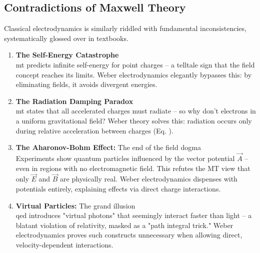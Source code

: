 \subsection{Contradictions of Maxwell Theory}
Classical electrodynamics is similarly riddled with fundamental inconsistencies, systematically glossed over in textbooks.
\begin{enumerate}
    \item \textbf{The Self-Energy Catastrophe}\\\gls{mt} predicts infinite self-energy for point charges – a telltale sign that the field concept reaches its limits. Weber electrodynamics elegantly bypasses this: by eliminating fields, it avoids divergent energies.
    \item \textbf{The Radiation Damping Paradox}\\\gls{mt} states that all accelerated charges must radiate – so why don’t electrons in a uniform gravitational field? Weber theory solves this: radiation occurs only during relative acceleration between charges (Eq. ).
    \item \textbf{The Aharonov-Bohm Effect:} The end of the field dogma\\Experiments show quantum particles influenced by the vector potential $\vec{A}$ – even in regions with no electromagnetic field. This refutes the MT view that only $\vec{E}$ and $\vec{B}$ are physically real. Weber electrodynamics dispenses with potentials entirely, explaining effects via direct charge interactions.
    \item \textbf{Virtual Particles:} The grand illusion\\\gls{qed} introduces "virtual photons" that seemingly interact faster than light – a blatant violation of relativity, masked as a "path integral trick." Weber electrodynamics proves such constructs unnecessary when allowing direct, velocity-dependent interactions.
\end{enumerate}

